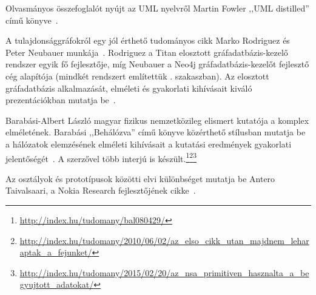 Olvasmányos összefoglalót nyújt az UML nyelvről Martin Fowler ,,UML distilled'' című könyve~\cite{fowler1997uml}.

A tulajdonsággráfokról egy jól érthető tudományos cikk Marko Rodriguez és Peter Neubauer munkája~\cite{Rodriguez2010}. Rodriguez a Titan elosztott gráfadatbázis-kezelő rendszer egyik fő fejlesztője, míg Neubauer a Neo4j gráfadatbázis-kezelőt fejlesztő cég alapítója (mindkét rendszert említettük . szakaszban). Az elosztott gráfadatbázis alkalmazását, elméleti és gyakorlati kihívásait kiváló prezentációkban mutatja be~\cite{RodriguezSlides2012,RodriguezSlides2013}.

Barabási-Albert László magyar fizikus nemzetközileg elismert kutatója a komplex  elméletének. Barabási ,,Behálózva'' című könyve közérthető stílusban mutatja be a hálózatok elemzésének elméleti kihívásait a kutatási eredmények gyakorlati jelentőségét~\cite{behalozva}. A szerzővel több interjú is készült.\footnote{\url{http://index.hu/tudomany/bal080429/}}\footnote{\url{http://index.hu/tudomany/2010/06/02/az_elso_cikk_utan_majdnem_leharaptak_a_fejunket/}}\footnote{\url{http://index.hu/tudomany/2015/02/20/az_nsa_primitiven_hasznalta_a_begyujtott_adatokat/}}

Az osztályok és prototípusok közötti elvi különbséget mutatja be Antero Taivalsaari, a Nokia Research fejlesztőjének cikke~\cite{DBLP:journals/joop/Taivalsaari97}.

